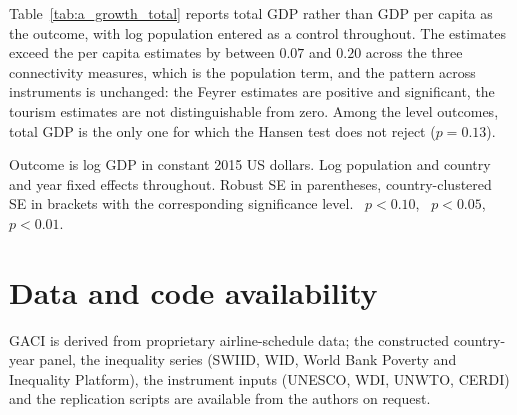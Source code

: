 Table~\ref{tab:a_growth_total} reports total GDP rather than GDP per capita as the outcome, with log population entered as a control throughout. The estimates exceed the per capita estimates by between $0.07$ and $0.20$ across the three connectivity measures, which is the population term, and the pattern across instruments is unchanged: the Feyrer estimates are positive and significant, the tourism estimates are not distinguishable from zero. Among the level outcomes, total GDP is the only one for which the Hansen test does not reject ($p=0.13$).

\begin{table}[H]\centering\caption{Total GDP as an outcome.}\label{tab:a_growth_total}
\begin{threeparttable}\small
\begin{tablenotes}\footnotesize\item Outcome is log GDP in constant 2015 US dollars. Log population and country and year fixed effects throughout. Robust SE in parentheses, country-clustered SE in brackets with the corresponding significance level. \sym{*}~$p<0.10$, \sym{**}~$p<0.05$, \sym{***}~$p<0.01$.\end{tablenotes}\end{threeparttable}\end{table}

\section*{Data and code availability}
GACI is derived from proprietary airline-schedule data; the constructed country-year panel, the inequality series (SWIID, WID, World Bank Poverty and Inequality Platform), the instrument inputs (UNESCO, WDI, UNWTO, CERDI) and the replication scripts are available from the authors on request.
